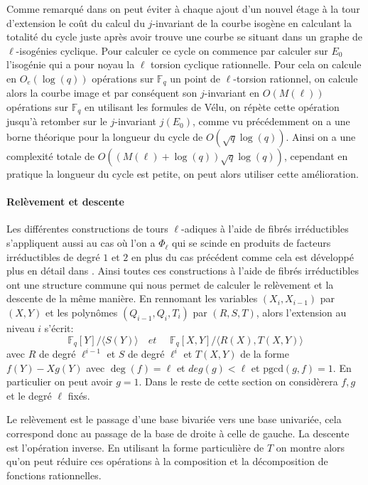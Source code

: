 \documentclass[10pt,a4paper]{book}
\theoremstyle{plain}
\theoremstyle{definition}
\theoremstyle{definition}
\theoremstyle{definition}
\theoremstyle{definition}
\theoremstyle{remark}
\theoremstyle{remark}
\theoremstyle{definition}
\begin{document}
Comme remarqué dans \cite{DeFeo-Doliskani-Schost13} on peut éviter à chaque ajout d'un nouvel étage à la tour d'extension le coût du calcul du $j$-invariant de la courbe isogène en calculant la totalité du cycle juste après avoir trouve une courbe se situant dans un graphe de $\ell$-isogénies cyclique. Pour calculer ce cycle on commence par calculer sur $E_0$ l'isogénie qui a pour noyau la $\ell$ torsion cyclique rationnelle. Pour cela on calcule en $O_e(\log(q))$ opérations sur $\mathbb{F}_q$ un point de $\ell$-torsion rationnel, on calcule alors la courbe image et par conséquent son $j$-invariant en $O(M(\ell))$ opérations sur $\mathbb{F}_q$ en utilisant les formules de Vélu, on répète cette opération jusqu'à retomber sur le $j$-invariant $j(E_0)$, comme vu précédemment on a une borne théorique pour la longueur du cycle de $O(\sqrt{q}\log(q))$. Ainsi on a une complexité totale de $O((M(\ell) + \log(q)) \sqrt{q} \log(q))$, cependant en pratique la longueur du cycle est petite, on peut alors utiliser cette amélioration.


\paragraph{Relèvement et descente}
Les différentes constructions de tours $\ell$-adiques à l'aide de fibrés irréductibles s'appliquent aussi au cas où l'on a $\Phi_{\ell}$ qui se scinde en produits de facteurs irréductibles de degré $1$ et $2$ en plus du cas précédent comme cela est développé plus en détail dans \cite{DeFeo-Doliskani-Schost13}. Ainsi toutes ces constructions à l'aide de fibrés irréductibles ont une structure commune qui nous permet de calculer le relèvement et la descente de la même manière. En rennomant les variables $(X_i,X_{i-1})$ par $(X,Y)$ et les polynômes $(Q_{i-1},Q_{i},T_i)$ par $(R,S,T)$, alors l'extension au niveau $i$ s'écrit:
\begin{equation}
\mathbb{F}_q[Y]/\langle S(Y) \rangle  \quad \textit{et } \quad \mathbb{F}_q[X,Y]/ \langle R(X), T(X,Y) \rangle
\end{equation}
avec $R$ de degré $\ell^{i-1}$ et $S$ de degré $\ell^i$ et $T(X,Y)$ de la forme $f(Y) -Xg(Y)$ avec $\deg(f)=\ell$ et $deg(g)< \ell$ et $ \mathrm{pgcd}(g,f)=1$. En particulier on peut avoir $g=1$. Dans le reste de cette section on considèrera $f,g$ et le degré $\ell$ fixés.

Le relèvement est le passage d'une base bivariée vers une base univariée, cela correspond donc au passage de la base de droite à celle de gauche. La descente est l'opération inverse. En utilisant la forme particulière de $T$ on montre alors qu'on peut réduire ces opérations à la composition et la décomposition de fonctions rationnelles.
\end{document}
